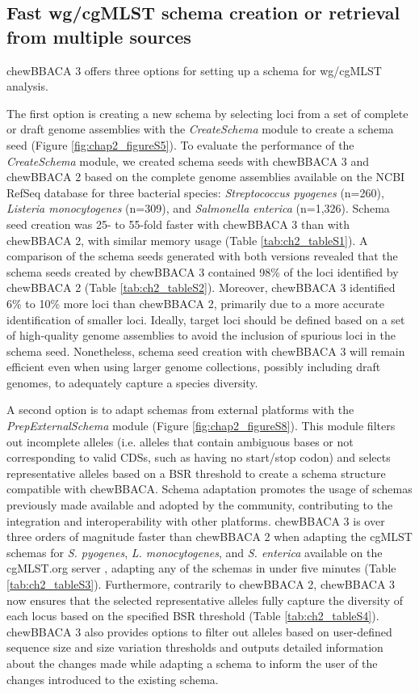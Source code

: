 \subsection{Fast wg/cgMLST schema creation or retrieval from multiple sources} \label{ssec:ch2_results_discussion_ssec1}

chewBBACA 3 offers three options for setting up a schema for \ac{wg/cgMLST} analysis.

The first option is creating a new schema by selecting loci from a set of complete or draft genome assemblies with the \textit{CreateSchema} module to create a schema seed (Figure \ref{fig:chap2_figureS5}). To evaluate the performance of the \textit{CreateSchema} module, we created schema seeds with chewBBACA 3 and chewBBACA 2 based on the complete genome assemblies available on the \ac{NCBI} RefSeq database \citep{sayers_database_2022} for three bacterial species: \textit{Streptococcus pyogenes} (n=260), \textit{Listeria monocytogenes} (n=309), and \textit{Salmonella enterica} (n=1,326). Schema seed creation was 25- to 55-fold faster with chewBBACA 3 than with chewBBACA 2, with similar memory usage (Table \ref{tab:ch2_tableS1}). A comparison of the schema seeds generated with both versions revealed that the schema seeds created by chewBBACA 3 contained 98\% of the loci identified by chewBBACA 2 (Table \ref{tab:ch2_tableS2}). Moreover, chewBBACA 3 identified 6\% to 10\% more loci than chewBBACA 2, primarily due to a more accurate identification of smaller loci. Ideally, target loci should be defined based on a set of high-quality genome assemblies to avoid the inclusion of spurious loci in the schema seed. Nonetheless, schema seed creation with chewBBACA 3 will remain efficient even when using larger genome collections, possibly including draft genomes, to adequately capture a species diversity.

A second option is to adapt schemas from external platforms with the \textit{PrepExternalSchema} module (Figure \ref{fig:chap2_figureS8}). This module filters out incomplete alleles (i.e. alleles that contain ambiguous bases or not corresponding to valid \acp{CDS}, such as having no start/stop codon) and selects representative alleles based on a \ac{BSR} threshold to create a schema structure compatible with chewBBACA. Schema adaptation promotes the usage of schemas previously made available and adopted by the community, contributing to the integration and interoperability with other platforms. chewBBACA 3 is over three orders of magnitude faster than chewBBACA 2 when adapting the \ac{cgMLST} schemas for \textit{S. pyogenes}, \textit{L. monocytogenes}, and \textit{S. enterica} available on the cgMLST.org server \citep{noauthor_cgmlstorg_nodate}, adapting any of the schemas in under five minutes (Table \ref{tab:ch2_tableS3}). Furthermore, contrarily to chewBBACA 2, chewBBACA 3 now ensures that the selected representative alleles fully capture the diversity of each locus based on the specified \ac{BSR} threshold (Table \ref{tab:ch2_tableS4}). chewBBACA 3 also provides options to filter out alleles based on user-defined sequence size and size variation thresholds and outputs detailed information about the changes made while adapting a schema to inform the user of the changes introduced to the existing schema.

